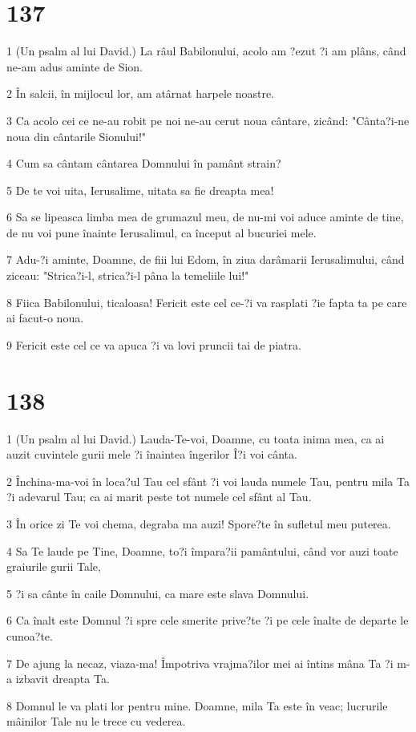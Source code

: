 \chapter{137}

\par 1 (Un psalm al lui David.) La râul Babilonului, acolo am ?ezut ?i am plâns, când ne-am adus aminte de Sion.
\par 2 În salcii, în mijlocul lor, am atârnat harpele noastre.
\par 3 Ca acolo cei ce ne-au robit pe noi ne-au cerut noua cântare, zicând: "Cânta?i-ne noua din cântarile Sionului!"
\par 4 Cum sa cântam cântarea Domnului în pamânt strain?
\par 5 De te voi uita, Ierusalime, uitata sa fie dreapta mea!
\par 6 Sa se lipeasca limba mea de grumazul meu, de nu-mi voi aduce aminte de tine, de nu voi pune înainte Ierusalimul, ca început al bucuriei mele.
\par 7 Adu-?i aminte, Doamne, de fiii lui Edom, în ziua darâmarii Ierusalimului, când ziceau: "Strica?i-l, strica?i-l pâna la temeliile lui!"
\par 8 Fiica Babilonului, ticaloasa! Fericit este cel ce-?i va rasplati ?ie fapta ta pe care ai facut-o noua.
\par 9 Fericit este cel ce va apuca ?i va lovi pruncii tai de piatra.

\chapter{138}

\par 1 (Un psalm al lui David.) Lauda-Te-voi, Doamne, cu toata inima mea, ca ai auzit cuvintele gurii mele ?i înaintea îngerilor Î?i voi cânta.
\par 2 Închina-ma-voi în loca?ul Tau cel sfânt ?i voi lauda numele Tau, pentru mila Ta ?i adevarul Tau; ca ai marit peste tot numele cel sfânt al Tau.
\par 3 În orice zi Te voi chema, degraba ma auzi! Spore?te în sufletul meu puterea.
\par 4 Sa Te laude pe Tine, Doamne, to?i împara?ii pamântului, când vor auzi toate graiurile gurii Tale,
\par 5 ?i sa cânte în caile Domnului, ca mare este slava Domnului.
\par 6 Ca înalt este Domnul ?i spre cele smerite prive?te ?i pe cele înalte de departe le cunoa?te.
\par 7 De ajung la necaz, viaza-ma! Împotriva vrajma?ilor mei ai întins mâna Ta ?i m-a izbavit dreapta Ta.
\par 8 Domnul le va plati lor pentru mine. Doamne, mila Ta este în veac; lucrurile mâinilor Tale nu le trece cu vederea.

